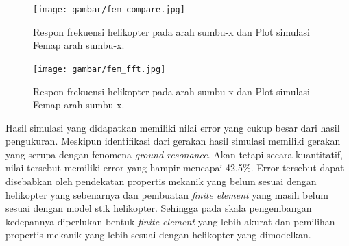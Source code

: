 \begin{figure}[H]
	\centering
	\texttt{[image: gambar/fem\_compare.jpg]}
	\caption{Respon frekuensi helikopter pada arah sumbu-x dan Plot simulasi Femap arah sumbu-x.}
	\label{fig:fem_validation_time_domain}
\end{figure}

\begin{figure}[H]
	\centering
	\texttt{[image: gambar/fem\_fft.jpg]}
	\caption{Respon frekuensi helikopter pada arah sumbu-x dan Plot simulasi Femap arah sumbu-x.}
	\label{fig:fem_fft}
\end{figure}

Hasil simulasi yang didapatkan memiliki nilai error yang cukup besar dari hasil pengukuran. Meskipun identifikasi dari gerakan hasil simulasi memiliki gerakan yang serupa dengan fenomena \textit{ground resonance}. Akan tetapi secara kuantitatif, nilai tersebut memiliki error yang hampir mencapai 42.5$\%$. Error tersebut dapat disebabkan oleh pendekatan propertis mekanik yang belum sesuai dengan helikopter yang sebenarnya dan pembuatan \textit{finite element} yang masih belum sesuai dengan model stik helikopter. Sehingga pada skala pengembangan kedepannya diperlukan bentuk \textit{finite element} yang lebih akurat dan pemilihan propertis mekanik yang lebih sesuai dengan helikopter yang dimodelkan.